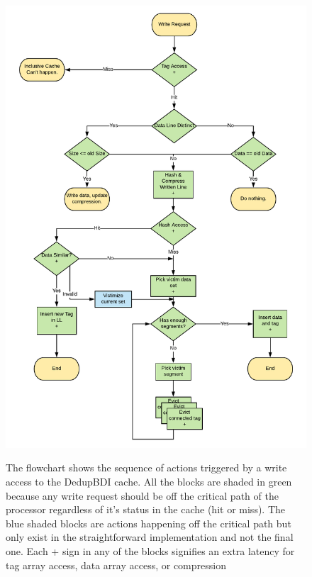 \begin{figure}
    \includegraphics[width=\textwidth]{DedupBDI_Write.pdf}
    \label{fig:DeduoBDI_Write}
    \caption[DedupBDI Write]{The flowchart shows the sequence of actions triggered by a write access to the DedupBDI cache. All the blocks are shaded in green because any write request should be off the critical path of the processor regardless of it's status in the cache (hit or miss). The blue shaded blocks are actions happening off the critical path but only exist in the straightforward implementation and not the final one. Each + sign in any of the blocks signifies an extra latency for tag array access, data array access, or compression}
\end{figure}

